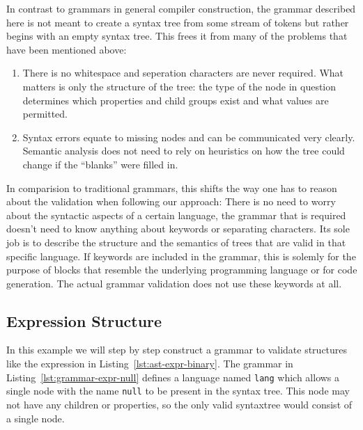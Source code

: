 \documentclass[sigconf,natbib=false,review=true,anonymous]{acmart}
\newcommand\todo[1]{{\bfseries ToDo: #1}}
\begin{document}
In contrast to grammars in general compiler construction, the grammar described here is not meant to create a syntax tree from some stream of tokens but rather begins with an empty syntax tree. This frees it from many of the problems that have been mentioned above:

\begin{enumerate}
\item There is no whitespace and seperation characters are never required. What matters is only the structure of the tree: the type of the node in question determines which properties and child groups exist and what values are permitted.
\item Syntax errors equate to missing nodes and can be communicated very clearly. Semantic analysis does not need to rely on heuristics on how the tree could change if the \enquote{blanks} were filled in.
\end{enumerate}

In comparision to traditional grammars, this shifts the way one has to reason about the validation when following our approach: There is no need to worry about the syntactic aspects of a certain language, the grammar that is required doesn’t need to know anything about keywords or separating characters. Its sole job is to describe the structure and the semantics of trees that are valid in that specific language. If keywords are included in the grammar, this is solemly for the purpose of blocks that resemble the underlying programming language or for code generation. The actual grammar validation does not use these keywords at all.

\subsection{Expression Structure}

In this example we will step by step construct a grammar to validate structures like the expression in Listing~\ref{lst:ast-expr-binary}. The grammar in Listing~\ref{lst:grammar-expr-null} defines a language named \texttt{lang} which allows a single node with the name \texttt{null} to be present in the syntax tree. This node may not have any children or properties, so the only valid syntaxtree would consist of a single node.
\end{document}
